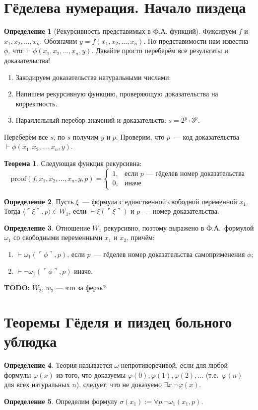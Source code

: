 \documentclass[a4paper,11pt]{article}
\theoremstyle{definition}
\newtheorem*{thm}{Теорема}
\newtheorem*{dfn}{Определение}
\newcommand{\proves}{\vdash}
\newcommand{\gn}[1]{\ulcorner #1 \urcorner}
\newcommand{\todo}[1]{\textbf{TODO:} #1}
\begin{document}
\section{Гёделева нумерация. Начало пиздеца}
\begin{dfn}[Рекурсивность представимых в Ф.А. функций]
Фиксируем $f$ и $x_1, x_2, \dots, x_n$. Обозначим $y = f(x_1, x_2, \dots, x_n)$.
По представимости нам известна $\phi$, что $\proves \phi(x_1, x_2, \dots, x_n,
y)$. Давайте просто переберём все результаты и доказательства!
\begin{enumerate}
\item Закодируем доказательства натуральными числами.
\item Напишем рекурсивную функцию, проверяющую доказательства на корректность.
\item Параллельный перебор значений и доказательств: $s = 2^y \cdot 3^p$.
\end{enumerate}
Переберём все $s$, по $s$ получим $y$ и $p$. Проверим, что $p$~--- код
доказательства $\proves \phi(x_1, x_2, \dots, x_n, y)$.
\end{dfn}
\begin{thm}
Следующая функция рекурсивна:
\[
\mathrm{proof}(f, x_1, x_2, \dots, x_n, y, p) =
\begin{cases}
1, & \text{если } p \text{ --- гёделев номер доказательства}\\
0, & \text{иначе}
\end{cases}
\]
\end{thm}
\begin{dfn}
Пусть $\xi$~--- формула с единственной свободной переменной $x_1$. Тогда
$\langle\gn{\xi}, p\rangle \in W_1$, если $\proves \xi(\gn{\xi})$ и $p$~--- номер
доказательства.
\end{dfn}
\begin{dfn}
Отношение $W_1$ рекурсивно, поэтому выражено в Ф.А.\ формулой $\omega_1$ со
свободными переменными $x_1$ и $x_2$, причём:
\begin{enumerate}
\item $\proves \omega_1(\gn{\phi}, p)$, если $p$~--- гёделев номер доказательства
  самоприменения $\phi$;
\item $\proves \neg\omega_1(\gn{\phi}, p)$ иначе.
\end{enumerate}
\end{dfn}
\todo{$W_2$, $w_2$ --- что за ферзь?}

\section{Теоремы Гёделя и пиздец больного ублюдка}
\begin{dfn}
Теория называется $\omega$-непротиворечивой, если для любой формулы $\varphi(x)$
из того, что доказуемы $\varphi(0), \varphi(1), \varphi(2), \dots$ (т.е.\
$\varphi(n)$ для всех натуральных $n$), следует, что не доказуемо $\exists
x.\neg\varphi(x)$.
\end{dfn}
\begin{dfn}
Определим формулу $\sigma(x_1) := \forall p.\neg\omega_1(x_1, p)$.
\end{dfn}
\end{document}
